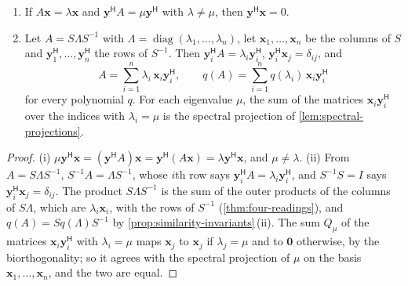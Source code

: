\begin{proposition}
\label{prop:left-eigenvectors}
\leavevmode
\begin{enumerate}
\item If $A\mathbf x=\lambda\mathbf x$ and $\mathbf y^{\mathsf H}A=\mu\mathbf y^{\mathsf H}$ with $\lambda\ne\mu$, then $\mathbf y^{\mathsf H}\mathbf x=0$.
\item Let $A=S\Lambda S^{-1}$ with $\Lambda=\operatorname{diag}(\lambda_1,\ldots,\lambda_n)$, let $\mathbf x_1,\ldots,\mathbf x_n$ be the columns of $S$ and $\mathbf y_1^{\mathsf H},\ldots,\mathbf y_n^{\mathsf H}$ the rows of $S^{-1}$. Then $\mathbf y_i^{\mathsf H}A=\lambda_i\mathbf y_i^{\mathsf H}$, $\mathbf y_i^{\mathsf H}\mathbf x_j=\delta_{ij}$, and
\[
A=\sum_{i=1}^n\lambda_i\,\mathbf x_i\mathbf y_i^{\mathsf H},\qquad q(A)=\sum_{i=1}^nq(\lambda_i)\,\mathbf x_i\mathbf y_i^{\mathsf H}
\]
for every polynomial $q$. For each eigenvalue $\mu$, the sum of the matrices $\mathbf x_i\mathbf y_i^{\mathsf H}$ over the indices with $\lambda_i=\mu$ is the spectral projection of \cref{lem:spectral-projections}.
\end{enumerate}
\end{proposition}

\begin{proof}
(i) $\mu\mathbf y^{\mathsf H}\mathbf x=(\mathbf y^{\mathsf H}A)\mathbf x=\mathbf y^{\mathsf H}(A\mathbf x)=\lambda\mathbf y^{\mathsf H}\mathbf x$, and $\mu\ne\lambda$. (ii) From $A=S\Lambda S^{-1}$, $S^{-1}A=\Lambda S^{-1}$, whose $i$th row says $\mathbf y_i^{\mathsf H}A=\lambda_i\mathbf y_i^{\mathsf H}$, and $S^{-1}S=I$ says $\mathbf y_i^{\mathsf H}\mathbf x_j=\delta_{ij}$. The product $S\Lambda S^{-1}$ is the sum of the outer products of the columns of $S\Lambda$, which are $\lambda_i\mathbf x_i$, with the rows of $S^{-1}$ (\cref{thm:four-readings}), and $q(A)=Sq(\Lambda)S^{-1}$ by \cref{prop:similarity-invariants}\,(ii). The sum $Q_\mu$ of the matrices $\mathbf x_i\mathbf y_i^{\mathsf H}$ with $\lambda_i=\mu$ maps $\mathbf x_j$ to $\mathbf x_j$ if $\lambda_j=\mu$ and to $\mathbf 0$ otherwise, by the biorthogonality; so it agrees with the spectral projection of $\mu$ on the basis $\mathbf x_1,\ldots,\mathbf x_n$, and the two are equal.
\end{proof}

